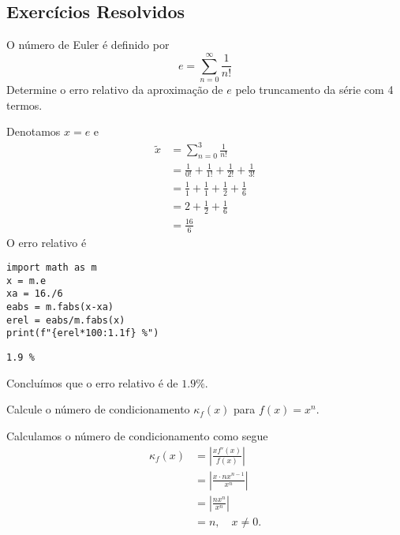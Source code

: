 \subsection{Exercícios Resolvidos}

\begin{exeresol}
  O número de Euler é definido por
  \begin{equation}
    e = \sum_{n=0}^\infty \frac{1}{n!}
  \end{equation}
  Determine o erro relativo da aproximação de $e$ pelo truncamento da série com 4 termos.
\end{exeresol}
\begin{resol}
  Denotamos $x = e$ e
  \begin{align}
    \tilde{x} &= \sum_{n=0}^3\frac{1}{n!}\\
              &= \frac{1}{0!} + \frac{1}{1!} + \frac{1}{2!} + \frac{1}{3!}\\
              &= \frac{1}{1} + \frac{1}{1} + \frac{1}{2} + \frac{1}{6}\\
              &= 2 + \frac{1}{2} + \frac{1}{6}\\
              &= \frac{16}{6}
  \end{align}
  O erro relativo é

\begin{lstlisting}
import math as m
x = m.e
xa = 16./6
eabs = m.fabs(x-xa)
erel = eabs/m.fabs(x)
print(f"{erel*100:1.1f} %")
\end{lstlisting}

\begin{verbatim}
1.9 %
\end{verbatim}

Concluímos que o erro relativo é de $1.9\%$.
\end{resol}

\begin{exeresol}
  Calcule o número de condicionamento $\kappa_f(x)$ para $f(x) = x^n$.
\end{exeresol}
\begin{resol}
  Calculamos o número de condicionamento como segue
  \begin{align}
    \kappa_f(x) &= \left|\frac{xf'(x)}{f(x)}\right|\\
                &= \left|\frac{x\cdot nx^{n-1}}{x^n}\right|\\
                &= \left|\frac{nx^n}{x^n}\right|\\
                &= n,\quad x\neq 0.
  \end{align}
\end{resol}

